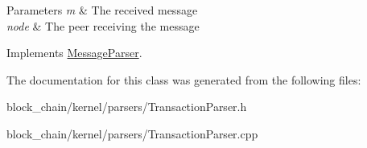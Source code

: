 \begin{DoxyParams}{Parameters}
{\em m} & The received message \\
\hline
{\em node} & The peer receiving the message \\
\hline
\end{DoxyParams}


Implements \mbox{\hyperlink{classMessageParser_a946f3b936dc01a75d6165329b159ecfe}{Message\+Parser}}.



The documentation for this class was generated from the following files\+:\begin{DoxyCompactItemize}
\item 
block\+\_\+chain/kernel/parsers/Transaction\+Parser.\+h\item 
block\+\_\+chain/kernel/parsers/Transaction\+Parser.\+cpp\end{DoxyCompactItemize}
